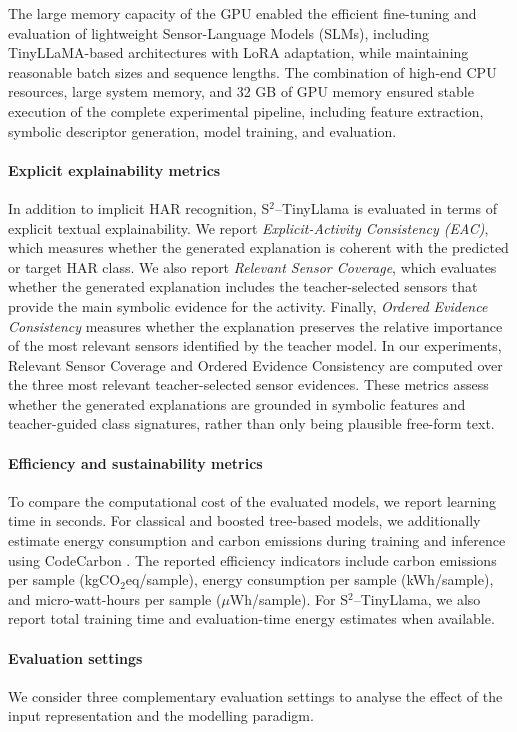 \documentclass[preprint,12pt]{elsarticle}
\begin{document}
The large memory capacity of the GPU enabled the efficient fine-tuning and evaluation of lightweight Sensor-Language Models (SLMs), including TinyLLaMA-based architectures with LoRA adaptation, while maintaining reasonable batch sizes and sequence lengths. The combination of high-end CPU resources, large system memory, and 32 GB of GPU memory ensured stable execution of the complete experimental pipeline, including feature extraction, symbolic descriptor generation, model training, and evaluation.


\paragraph{Explicit explainability metrics}
In addition to implicit HAR recognition, S$^2$--TinyLlama is evaluated in terms of explicit textual explainability. We report \emph{Explicit-Activity Consistency (EAC)}, which measures whether the generated explanation is coherent with the predicted or target HAR class. We also report \emph{Relevant Sensor Coverage}, which evaluates whether the generated explanation includes the teacher-selected sensors that provide the main symbolic evidence for the activity. Finally, \emph{Ordered Evidence Consistency} measures whether the explanation preserves the relative importance of the most relevant sensors identified by the teacher model. In our experiments, Relevant Sensor Coverage and Ordered Evidence Consistency are computed over the three most relevant teacher-selected sensor evidences. These metrics assess whether the generated explanations are grounded in symbolic features and teacher-guided class signatures, rather than only being plausible free-form text.

\paragraph{Efficiency and sustainability metrics}
To compare the computational cost of the evaluated models, we report learning time in seconds. For classical and boosted tree-based models, we additionally estimate energy consumption and carbon emissions during training and inference using CodeCarbon \cite{fischer2025ground}. The reported efficiency indicators include carbon emissions per sample (kgCO$_2$eq/sample), energy consumption per sample (kWh/sample), and micro-watt-hours per sample ($\mu$Wh/sample). For S$^2$--TinyLlama, we also report total training time and evaluation-time energy estimates when available. 

\paragraph{Evaluation settings}
We consider three complementary evaluation settings to analyse the effect of the input representation and the modelling paradigm.
\end{document}
